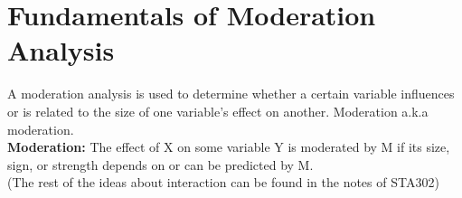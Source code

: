 \documentclass{article}
\theoremstyle{definition}
\begin{document}
\section{Fundamentals of Moderation Analysis}
A moderation analysis is used to determine whether a certain variable influences or is related to the size of one variable's effect on another. Moderation a.k.a moderation.\\
\textbf{Moderation: }The effect of X on some variable Y is moderated by M if its size, sign, or strength depends on or can be predicted by M. \\
(The rest of the ideas about interaction can be found in the notes of STA302)
\end{document}
